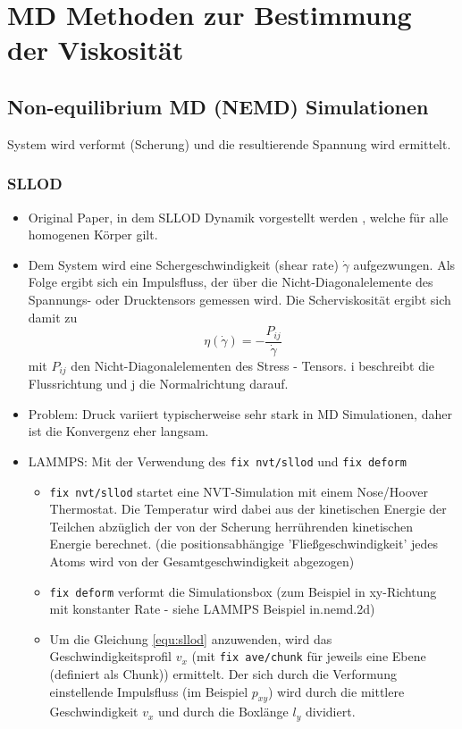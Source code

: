 \documentclass[a4paper, 10pt, 
               numbers=noenddot, toc=graduated,
               headsepline=true, footsepline=true,
               twoside=false, titlepage=true, 
               bibliography=totoc]{scrartcl}
\begin{document}
\section{MD Methoden zur Bestimmung der Viskosität}\label{sec:visc}

\subsection{Non-equilibrium MD (NEMD) Simulationen}

System wird verformt (Scherung) und die resultierende Spannung wird ermittelt. 


	\subsubsection{SLLOD}
		\begin{itemize}
		 	\item Original Paper, in dem SLLOD Dynamik vorgestellt werden \cite{Evans1984}, welche für alle homogenen Körper gilt.
		 	\item Dem System wird eine Schergeschwindigkeit (shear rate) $\dot{\gamma}$ aufgezwungen. Als Folge ergibt sich ein Impulsfluss, der über die Nicht-Diagonalelemente des Spannungs- oder Drucktensors gemessen wird\cite{Tenney2010}. Die Scherviskosität ergibt sich damit zu 
				\begin{equation}
					\eta\left(\dot{\gamma}\right) = - \frac{P_{ij}}{\dot{\gamma}}
					\label{equ:sllod}
				\end{equation}
 mit $P_{ij}$ den Nicht-Diagonalelementen des Stress - Tensors. i beschreibt die Flussrichtung und j die Normalrichtung darauf. 
		 	\item Problem: Druck variiert typischerweise sehr stark in MD Simulationen, daher ist die Konvergenz eher langsam\cite{Tenney2010}.
		 	\item LAMMPS: Mit der Verwendung des \texttt{fix nvt/sllod} und \texttt{fix deform} 
				\begin{itemize}
					\item \texttt{fix nvt/sllod} startet eine NVT-Simulation mit einem Nose/Hoover Thermostat. Die Temperatur wird dabei aus der kinetischen Energie der Teilchen abzüglich der von der Scherung herrührenden kinetischen Energie berechnet. (die positionsabhängige 'Fließgeschwindigkeit' jedes Atoms wird von der Gesamtgeschwindigkeit abgezogen)
					\item \texttt{fix deform} verformt die Simulationsbox (zum Beispiel in xy-Richtung mit konstanter Rate - siehe LAMMPS Beispiel in.nemd.2d)
					\item Um die Gleichung \ref{equ:sllod} anzuwenden, wird das Geschwindigkeitsprofil $v_x$ (mit \texttt{fix ave/chunk} für jeweils eine Ebene (definiert als Chunk)) ermittelt. Der sich durch die Verformung einstellende Impulsfluss (im Beispiel $p_{xy}$) wird durch die mittlere Geschwindigkeit $v_x$ und durch die Boxlänge $l_y$ dividiert.
				\end{itemize}
		\end{itemize}
		
\end{document}

